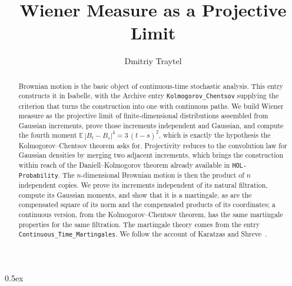 \documentclass[11pt,a4paper]{article}
\begin{document}
\title{Wiener Measure as a Projective Limit}
\author{Dmitriy Traytel}
\maketitle

\begin{abstract}
  Brownian motion is the basic object of continuous-time stochastic analysis.
  This entry constructs it in Isabelle, with the Archive entry
  \texttt{Kolmogorov\_Chentsov} supplying the criterion that turns the
  construction into one with continuous paths.  We build Wiener measure as
  the projective limit of finite-dimensional distributions assembled from
  Gaussian increments, prove those increments independent and Gaussian, and
  compute the fourth moment
  $\mathbb{E}\,|B_t - B_s|^{4} = 3\,(t-s)^{2}$, which is exactly the
  hypothesis the Kolmogorov--Chentsov theorem asks for.  Projectivity reduces
  to the convolution law for Gaussian densities by merging two adjacent
  increments, which brings the construction within reach of the
  Daniell--Kolmogorov theorem already available in \texttt{HOL-Probability}.
  The $n$-dimensional Brownian motion is then the product of $n$ independent
  copies.  We prove its increments independent of its natural filtration,
  compute its Gaussian moments, and show that it is a martingale, as are the
  compensated square of its norm and the compensated products of its
  coordinates; a continuous version, from the Kolmogorov--Chentsov theorem,
  has the same martingale properties for the same filtration.  The
  martingale theory comes from the entry
  \texttt{Continuous\_Time\_Martingales}.
  We follow the account of Karatzas and Shreve~\cite{KaratzasShreve}.
\end{abstract}

\tableofcontents

\parindent 0pt\parskip 0.5ex





\end{document}
